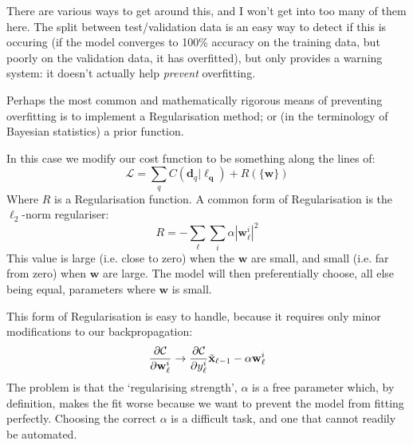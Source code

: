 \documentclass[a4paper,openany,11pt]{book}
\newcommand\cec[1]{\tilde{\vec{#1}}}
\renewcommand\vec[1]{\boldsymbol{\mathbf{#1}}}
\begin{document}
				There are various ways to get around this, and I won't get into too many of them here. The split between test/validation data is an easy way to detect if this is occuring (if the model converges to 100\% accuracy on the training data, but poorly on the validation data, it has overfitted), but only provides a warning system: it doesn't actually help \textit{prevent} overfitting. 

				Perhaps the most common and mathematically rigorous means of preventing overfitting is to implement a Regularisation method; or (in the terminology of Bayesian statistics) a prior function. 

				In this case we modify our cost function to be something along the lines of:
				\begin{equation}
					\mathcal{L} = \sum_q C(\vec{d}_q | \vec{\ell_q}) + R(\{\vec{w}\})
				\end{equation}
				Where $R$ is a Regularisation function. A common form of Regularisation is the $\ell_2$-norm regulariser:
				\begin{equation}
					R = - \sum_{\ell} \sum_i \alpha |\vec{w}_\ell^i|^2
				\end{equation}
				This value is large (i.e. close to zero) when the $\vec{w}$ are small, and small (i.e. far from zero) when $\vec{w}$ are large. The model will then preferentially choose, all else being equal, parameters where $\vec{w}$ is small.

				This form of Regularisation is easy to handle, because it requires only minor modifications to our backpropagation:
				\begin{equation}
					\pdiv{\mathcal{C}}{\vec{w}_\ell^i} \to  \pdiv{\mathcal{C}}{y_\ell^i} \cec{x}_{\ell-1} - \alpha \vec{w}_\ell^i
				\end{equation}
				The problem is that the `regularising strength', $\alpha$ is a free parameter which, by definition, makes the fit worse because we want to prevent the model from fitting perfectly. Choosing the correct $\alpha$ is a difficult task, and one that cannot readily be automated. 

			
			
\end{document}
